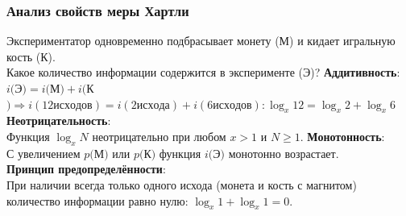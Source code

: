 \documentclass[10pt]{beamer}
\begin{document}
	\begin{frame}
		\frametitle{Анализ свойств меры Хартли}
		Экспериментатор одновременно подбрасывает монету (М) и кидает игральную кость (К).\\
		Какое количество информации содержится в эксперименте (Э)?
		\vskip 0.5cm
		\textbf{Аддитивность}:\\
		$i($Э$) = i($М$) + i($К$) \Rightarrow i(12 исходов) = i(2 исхода) + i(6 исходов): \log_x 12 = \log_x 2 + \log_x 6$\\
		\vskip 0.3cm
		\textbf{Неотрицательность}:\\
		Функция $\log_x N$ неотрицательно при любом $x > 1$ и $N \geq 1$.
		\vskip 0.3cm
		\textbf{Монотонность}:\\
		С увеличением $p($М$)$ или $p($К$)$ функция $i($Э$)$ монотонно возрастает.\\
		\vskip 0.3cm
		\textbf{Принцип предопределённости}:\\
		При наличии всегда только одного исхода (монета и кость с магнитом) количество информации равно нулю: $\log_x 1 + \log_x 1 = 0$.
    	\end{frame}
\end{document}
